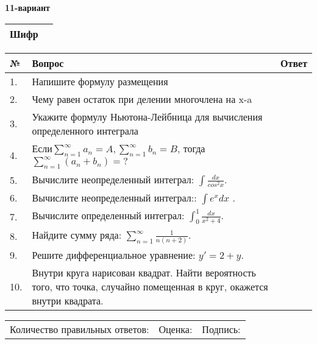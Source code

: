 \documentclass{article}
\begin{document}
  \egroup
  
  \newpage
  
  
  \textbf{11-вариант}\\
  
  \bgroup
  \def\arraystretch{1.6} %
  
  \begin{tabular}{|m{5.7cm}|m{9.5cm}|}
  \hline
  Шифр & \\
  \hline
  \end{tabular}
  
  \vspace{1cm}
  
  \begin{tabular}{|m{0.7cm}|m{10cm}|m{4cm}|}
  \hline
  № & Вопрос & Ответ \\
  \hline
  1. & Напишите формулу размещения &  \\
  \hline
  2. & Чему равен остаток при делении многочлена на x-a &  \\
  \hline
  3. & Укажите формулу Ньютона-Лейбница для вычисления определенного интеграла &  \\
  \hline
  4. & Если\(\sum_{n = 1}^{\infty}a_{n} = A,\sum_{n = 1}^{\infty}b_{n} = B\), тогда \(\sum_{n = 1}^{\infty}\left( a_{n} + b_{n} \right) = ?\) &  \\
  \hline
  5. & Вычислите неопределенный интеграл: \(\int\frac{dx}{cos^{2}x}\). &  \\
  \hline
  6. & Вычислите неопределенный интеграл:: \(\int{e^{x}dx}\) . &  \\
  \hline
  7. & Вычислите определенный интеграл: \(\int_{0}^{1}\frac{dx}{x^{2} + 4}\). &  \\
  \hline
  8. & Найдите сумму ряда: \(\sum_{n = 1}^{\infty}\frac{1}{n(n + 2)}\). &  \\
  \hline
  9. & Решите дифференциальное уравнение: \(y' = 2 + y\). &  \\
  \hline
  10. & Внутри круга нарисован квадрат. Найти вероятность того, что точка, случайно помещенная в круг, окажется внутри квадрата. &  \\
  \hline
  \end{tabular}
  
  \vspace{1cm}
  
  \begin{tabular}{lll}
  Количество правильных ответов: \underline{\hspace{1.5cm}} & 
  Оценка: \underline{\hspace{1.5cm}} & 
  Подпись: \underline{\hspace{2cm}} \\
  \end{tabular}
  
\end{document}
